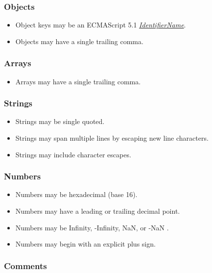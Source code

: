 \documentclass{article}
\newcommand{\token}[1]{\emph{#1}}
\newcommand{\esref}[2]{\href{http://www.ecma-international.org/ecma-262/5.1/\#sec-#2}{#1}}
\begin{document}
\subsubsection*{Objects}

\begin{itemize}
	\item Object keys may be an ECMAScript 5.1 \esref{\token{IdentifierName}}{7.6}.
	\item Objects may have a single trailing comma.
\end{itemize}

\subsubsection*{Arrays}

\begin{itemize}
	\item Arrays may have a single trailing comma.
\end{itemize}

\subsubsection*{Strings}

\begin{itemize}
	\item Strings may be single quoted.
	\item Strings may span multiple lines by escaping new line characters.
	\item Strings may include character escapes.
\end{itemize}

\subsubsection*{Numbers}

\begin{itemize}
	\item Numbers may be hexadecimal (base 16).
	\item Numbers may have a leading or trailing decimal point.
	\item Numbers may be Infinity, -Infinity, NaN, or -NaN \cite{float}.
	\item Numbers may begin with an explicit plus sign.
\end{itemize}

\subsubsection*{Comments}
\end{document}
